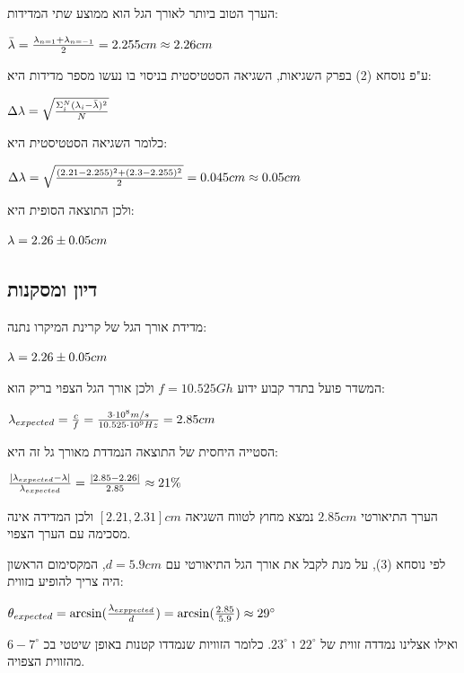 \documentclass[14pt]{extarticle}
\makeatletter
\newenvironment{lefteqs}{%
    \begin{english}%
    \begin{flushleft}%
    \renewcommand{\arraystretch}{1.3}%
    $\begin{array}{@{}l@{}}%
}{%
    \end{array}$%
    \end{flushleft}%
    \end{english}%
}
\makeatother
\begin{document}
הערך הטוב ביותר לאורך הגל הוא ממוצע שתי המדידות:
\begin{lefteqs}
    \bar{\lambda} = \frac{\lambda_{n=1} + \lambda_{n=-1}}{2} = 2.255cm \approx 2.26cm
\end{lefteqs}

ע"פ נוסחא (2) בפרק השגיאות, השגיאה הסטטיסטית בניסוי בו נעשו מספר מדידות היא:
\begin{lefteqs}
    \Delta \lambda = \sqrt{\frac{\Sigma_i^N (\lambda_i - \bar{\lambda})^2}{N}}
\end{lefteqs}

כלומר השגיאה הסטטיסטית היא:
\begin{lefteqs}
    \Delta \lambda = \sqrt{\frac{(2.21 - 2.255)^2 + (2.3 - 2.255)^2}{2}} = 0.045cm \approx 0.05cm
\end{lefteqs}

ולכן התוצאה הסופית היא:
\begin{lefteqs}
    \lambda = 2.26 \pm 0.05cm
\end{lefteqs}

\subsection*{דיון ומסקנות}

מדידת אורך הגל של קרינת המיקרו נתנה:
\begin{lefteqs}
    \lambda = 2.26 \pm 0.05cm
\end{lefteqs}

המשדר פועל בתדר קבוע ידוע $f=10.525Gh$ ולכן אורך הגל הצפוי בריק הוא:

\begin{lefteqs}
    \lambda_{expected} = \frac{c}{f} = \frac{3 \cdot 10^8 m/s}{10.525 \cdot 10^9 Hz} = 2.85cm
\end{lefteqs}

הסטייה היחסית של התוצאה הנמדדת מאורך גל זה היא:

\begin{lefteqs}
    \frac{|\lambda_{expected} - \lambda|}{\lambda_{expected}} = \frac{|2.85 - 2.26|}{2.85} \approx 21 \%
\end{lefteqs}

הערך התיאורטי $2.85cm$ נמצא מחוץ לטווח השגיאה $[2.21, 2.31]cm$ ולכן המדידה אינה מסכימה עם הערך הצפוי.

לפי נוסחא (3), על מנת לקבל את אורך הגל התיאורטי עם $d=5.9cm$, המקסימום הראשון היה צריך להופיע בזווית:
\begin{lefteqs}
    \theta_{expected} = \arcsin(\frac{\lambda_{exppected}}{d}) = \arcsin(\frac{2.85}{5.9}) \approx 29^\circ
\end{lefteqs}
ואילו אצלינו נמדדה זווית של $22^\circ$ ו $23^\circ$.
כלומר הזוויות שנמדדו קטנות באופן שיטטי בכ $6-7^\circ$ מהזווית הצפויה.
\end{document}
